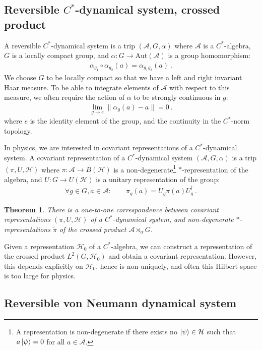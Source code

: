 \documentclass{article}
\newcommand{\mA}{\mathcal{A}}
\newcommand{\mH}{\mathcal{H}}
\newtheorem{theorem}{Theorem}
\theoremstyle{definition}
\begin{document}
  \subsection*{Reversible $C^{*}$-dynamical system, crossed product}

  A reversible $C^{*}$-dynamical system is a trip $(\mA, G, \alpha)$ where $\mA$
  is a $C^{*}$-algebra, $G$ is a locally compact group, and $\alpha:G\to \text{Aut}
  (\mA)$ is a group homomorphism:
  \begin{eqnarray}
    \alpha_{g_1}\circ\alpha_{g_2}(a)=\alpha_{g_1g_2}(a)\ .
  \end{eqnarray}
  We choose $G$ to be locally compact so that we have a left and right invariant
  Haar measure. To be able to integrate elements of $\mA$ with respect to this measure,
  we often require the action of $\alpha$ to be strongly continuous in $g$:
  \begin{eqnarray}
    \lim_{g\to e}\|\alpha_g(a)-a\|=0\ .
  \end{eqnarray}
  where $e$ is the identity element of the group, and the continuity in the
  $C^{*}$-norm topology.

  In physics, we are interested in covariant representations of a $C^{*}$-dynamical
  system. A covariant representation of a $C^{*}$-dynamical system
  $(\mA,G,\alpha )$ is a trip $(\pi, U,\mH)$ where $\pi:\mA \to B(\mathcal{H})$
  is a non-degenerate\footnote{A representation is non-degenerate if there
  exists no $\ket{\psi}\in\mathcal{H}$ such that $a\ket{\psi}=0$ for all
  $a\in\mA$.} $*$-representation of the algebra, and $U:G\to U(\mathcal{H})$ is
  a unitary representation of the group:
  \begin{eqnarray}
    \forall g\in G, a\in\mathcal{A}:\qquad \pi_g(a)=U_g \pi(a)U_g^\dagger\ .
  \end{eqnarray}
  \begin{theorem}
    There is a one-to-one correspondence between covariant representations $( \pi
    , U,\mathcal{H})$ of a $C^{*}$-dynamical system, and non-degenerate $*$-representations
    $\tilde{\pi}$ of the crossed product $\mA\rtimes_{\alpha}G$.
  \end{theorem}
  Given a representation $\mathcal{H}_{0}$ of a $C^{*}$-algebra, we can
  construct a representation of the crossed product $L^{2}(G,\mH_{0})$ and
  obtain a covariant representation. However, this depends explicitly on
  $\mH_{0}$, hence is non-uniquely, and often this Hilbert space is too large
  for physics.

  \subsection*{Reversible von Neumann dynamical system}
\end{document}

